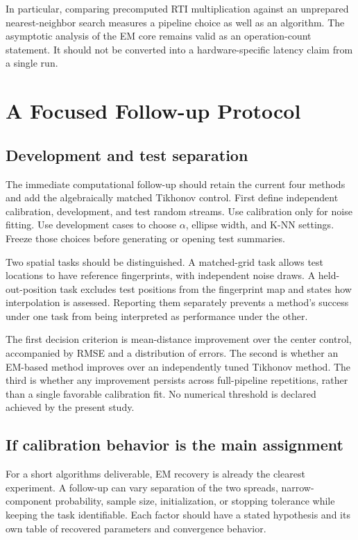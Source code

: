 \documentclass[conference,letterpaper]{IEEEtran}
\begin{document}
In particular, comparing precomputed RTI multiplication against an unprepared nearest-neighbor search measures a pipeline choice as well as an algorithm. The asymptotic analysis of the EM core remains valid as an operation-count statement. It should not be converted into a hardware-specific latency claim from a single run.

\section{A Focused Follow-up Protocol}
\subsection{Development and test separation}
The immediate computational follow-up should retain the current four methods and add the algebraically matched Tikhonov control. First define independent calibration, development, and test random streams. Use calibration only for noise fitting. Use development cases to choose $\alpha$, ellipse width, and K-NN settings. Freeze those choices before generating or opening test summaries.

Two spatial tasks should be distinguished. A matched-grid task allows test locations to have reference fingerprints, with independent noise draws. A held-out-position task excludes test positions from the fingerprint map and states how interpolation is assessed. Reporting them separately prevents a method's success under one task from being interpreted as performance under the other.

The first decision criterion is mean-distance improvement over the center control, accompanied by RMSE and a distribution of errors. The second is whether an EM-based method improves over an independently tuned Tikhonov method. The third is whether any improvement persists across full-pipeline repetitions, rather than a single favorable calibration fit. No numerical threshold is declared achieved by the present study.

\subsection{If calibration behavior is the main assignment}
For a short algorithms deliverable, EM recovery is already the clearest experiment. A follow-up can vary separation of the two spreads, narrow-component probability, sample size, initialization, or stopping tolerance while keeping the task identifiable. Each factor should have a stated hypothesis and its own table of recovered parameters and convergence behavior.
\end{document}
